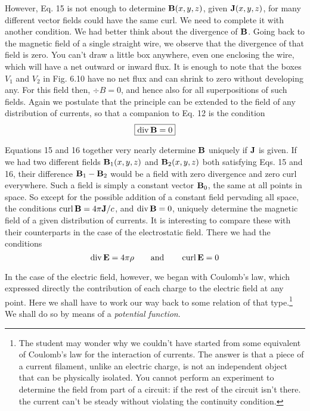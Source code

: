 However, Eq. 15 is not enough to determine $\mathbf{B}(x,y,z)$, given
$\mathbf{J}(x,y,z)$, for many different vector fields could have the same curl.
We need to complete it with another condition. We had better think
about the divergence of $\mathbf{B}$. Going back to the magnetic field of a
single straight wire, we observe that the divergence of that field is
zero. You can't draw a little box anywhere, even one enclosing the
wire, which will have a net outward or inward flux. It is enough to
note that the boxes $V_1$ and $V_2$ in Fig. 6.10 have no net flux and can
shrink to zero without developing any. For this field then, $\div B = 0$,
and hence also for all superpositions of such fields. Again we postulate
that the principle can be extended to the field of any distribution
of currents, so that a companion to Eq. 12 is the condition
\begin{equation}
\boxed{
  \operatorname{div}\mathbf{B} = 0
}
\end{equation}

Equations 15 and 16 together very nearly determine $\mathbf{B}$ uniquely
if $\mathbf{J}$ is given. If we had two different fields $\mathbf{B}_1(x,y,z)$ and $\mathbf{B}_2(x,y,z)$
both satisfying Eqs. 15 and 16, their difference $\mathbf{B}_1-\mathbf{B}_2$ would be a
field with zero divergence and zero curl everywhere. Such a field is
simply a constant vector $\mathbf{B}_0$, the same at all points in space. So except
for the possible addition of a constant field pervading all space, the
conditions $\operatorname{curl}\mathbf{B}=4\pi\mathbf{J}/c$, and $\operatorname{div} \mathbf{B} = 0$, uniquely determine the
magnetic field of a given distribution of currents. It is interesting
to compare these with their counterparts in the case of the electrostatic
field. There we had the conditions
\begin{equation}
  \operatorname{div}\mathbf{E} = 4\pi\rho \qquad \text{and} \qquad \operatorname{curl}\mathbf{E}=0
\end{equation}

In the case of the electric field, however, we began with Coulomb's
law, which expressed directly the contribution of each charge to the
electric field at any point. Here we shall have to work our way back
to some relation of that type.\footnote{The student may wonder why we couldn't have started from some equivalent of
Coulomb's law for the interaction of currents. The answer is that a piece of a current
filament, unlike an electric charge, is not an independent object that can be physically
isolated. You cannot perform an experiment to determine the field from part of a
circuit: if the rest of the circuit isn't there. the current can't be steady without violating
the continuity condition.} We shall do so by means of a \emph{potential
function}.

